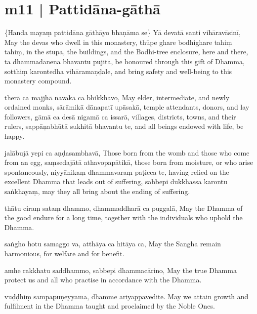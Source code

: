 \section*{m11 | Pattidāna-gāthā}

\begin{chantsubsection}
    \chantnote
    {\{Handa mayaṃ pattidāna gāthāyo bhaṇāma se\}}
\chantgap
  \chantline
    {Yā devatā santi vihāravāsinī, }
    {May the devas who dwell in this monastery,}
  \chantline
    {thūpe ghare bodhighare tahiṃ tahiṃ, }
    {in the stupa, the buildings, and the Bodhi-tree enclosure, here and there,}
  \chantline
    {tā dhammadānena bhavantu pūjitā, }
    {be honoured through this gift of Dhamma,}
  \chantline
    {sotthiṃ karontedha vihāramaṇḍale, }
    {and bring safety and well-being to this monastery compound.}

  \chantline
    {therā ca majjhā navakā ca bhikkhavo, }
    {May elder, intermediate, and newly ordained monks,}
  \chantline
    {sārāmikā dānapatī upāsakā, }
    {temple attendants, donors, and lay followers,}
  \chantline
    {gāmā ca desā nigamā ca issarā, }
    {villages, districts, towns, and their rulers,}
  \chantline
    {sappāṇabhūtā sukhitā bhavantu te, }
    {and all beings endowed with life, be happy.}

  \chantline
    {jalābujā yepi ca aṇḍasambhavā, }
    {Those born from the womb and those who come from an egg,}
  \chantline
    {saṃsedajātā athavopapātikā, }
    {those born from moisture, or who arise spontaneously,}
  \chantline
    {niyyānikaṃ dhammavaraṃ paṭicca te, }
    {having relied on the excellent Dhamma that leads out of suffering,}
  \chantline
    {sabbepi dukkhassa karontu saṅkhayaṃ, }
    {may they all bring about the ending of suffering.}

  \chantlinepair
    {thātu ciraṃ sataṃ dhammo, }
    {dhammaddharā ca puggalā, }
    {May the Dhamma of the good endure for a long time, together with the individuals who uphold the Dhamma.}

  \chantlinepair
    {saṅgho hotu samaggo va, }
    {atthāya ca hitāya ca, }
    {May the Sangha remain harmonious, for welfare and for benefit.}

  \chantlinepair
    {amhe rakkhatu saddhammo, }
    {sabbepi dhammacārino, }
    {May the true Dhamma protect us and all who practise in accordance with the Dhamma.}

  \chantlinepair
    {vuḍḍhiṃ sampāpuṇeyyāma, }
    {dhamme ariyappavedite. }
    {May we attain growth and fulfilment in the Dhamma taught and proclaimed by the Noble Ones.}

\end{chantsubsection}
